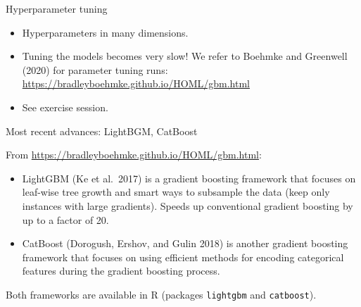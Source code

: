 \documentclass[
  10pt,
  ignorenonframetext,
]{beamer}
\providecommand{\tightlist}{%
  \setlength{\itemsep}{0pt}\setlength{\parskip}{0pt}}
\begin{document}
\begin{frame}
\begin{block}{Hyperparameter tuning}
\label{hyperparameter-tuning}
\(~\)

\begin{itemize}
\tightlist
\item
  Hyperparameters in many dimensions.
\end{itemize}

\vspace{2mm}

\begin{itemize}
\tightlist
\item
  Tuning the models becomes very slow! We refer to Boehmke and Greenwell
  (2020) for parameter tuning runs:\\
  \url{https://bradleyboehmke.github.io/HOML/gbm.html}
\end{itemize}

\vspace{2mm}

\begin{itemize}
\tightlist
\item
  See exercise session.
\end{itemize}
\end{block}
\end{frame}

\begin{frame}[fragile]{Most recent advances: LightBGM, CatBoost}
\label{most-recent-advances-lightbgm-catboost}
\vspace{2mm}

From \url{https://bradleyboehmke.github.io/HOML/gbm.html}:

\begin{itemize}
\item
  LightGBM (Ke et al.~2017) is a gradient boosting framework that
  focuses on leaf-wise tree growth and smart ways to subsample the data
  (keep only instances with large gradients). Speeds up conventional
  gradient boosting by up to a factor of 20.
\item
  CatBoost (Dorogush, Ershov, and Gulin 2018) is another gradient
  boosting framework that focuses on using efficient methods for
  encoding categorical features during the gradient boosting process.
\end{itemize}

\vspace{2mm}

Both frameworks are available in R (packages \texttt{lightgbm} and
\texttt{catboost}).
\end{frame}
\end{document}

